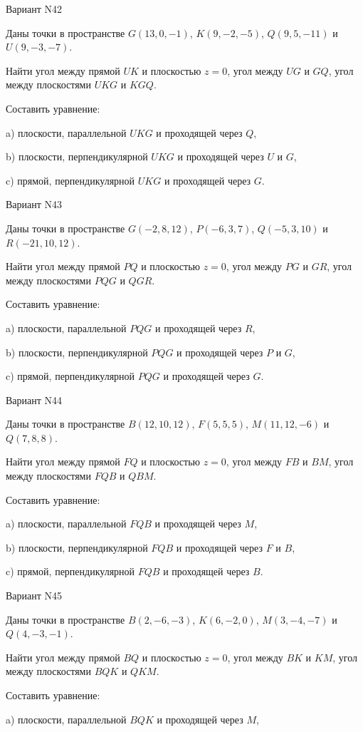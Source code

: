 \documentclass[11pt]{report}
\begin{document}
Вариант N42

Даны точки в пространстве
$G(13, 0, -1)$, $K(9, -2, -5)$, $Q(9, 5, -11)$ и
$U(9, -3, -7)$.

Найти угол между прямой $UK$ и плоскостью $z = 0$, угол между $UG$ и $GQ$, угол между плоскостями $UKG$ 
и $KGQ$.

Составить уравнение: 

a) плоскости, параллельной $UKG$ и проходящей через $Q$,

b) плоскости, перпендикулярной $UKG$ и проходящей через $U$ и $G$,

c) прямой, перпендикулярной $UKG$ и проходящей через $G$.

Вариант N43

Даны точки в пространстве
$G(-2, 8, 12)$, $P(-6, 3, 7)$, $Q(-5, 3, 10)$ и
$R(-21, 10, 12)$.

Найти угол между прямой $PQ$ и плоскостью $z = 0$, угол между $PG$ и $GR$, угол между плоскостями $PQG$ 
и $QGR$.

Составить уравнение: 

a) плоскости, параллельной $PQG$ и проходящей через $R$,

b) плоскости, перпендикулярной $PQG$ и проходящей через $P$ и $G$,

c) прямой, перпендикулярной $PQG$ и проходящей через $G$.

Вариант N44

Даны точки в пространстве
$B(12, 10, 12)$, $F(5, 5, 5)$, $M(11, 12, -6)$ и
$Q(7, 8, 8)$.

Найти угол между прямой $FQ$ и плоскостью $z = 0$, угол между $FB$ и $BM$, угол между плоскостями $FQB$ 
и $QBM$.

Составить уравнение: 

a) плоскости, параллельной $FQB$ и проходящей через $M$,

b) плоскости, перпендикулярной $FQB$ и проходящей через $F$ и $B$,

c) прямой, перпендикулярной $FQB$ и проходящей через $B$.

Вариант N45

Даны точки в пространстве
$B(2, -6, -3)$, $K(6, -2, 0)$, $M(3, -4, -7)$ и
$Q(4, -3, -1)$.

Найти угол между прямой $BQ$ и плоскостью $z = 0$, угол между $BK$ и $KM$, угол между плоскостями $BQK$ 
и $QKM$.

Составить уравнение: 

a) плоскости, параллельной $BQK$ и проходящей через $M$,
\end{document}
